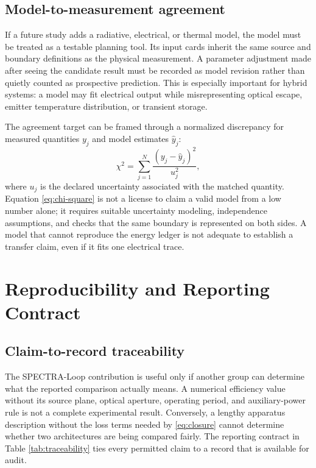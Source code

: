 \documentclass[conference]{../../../../Conference-LaTeX-template_10-17-19/IEEEtran}
\begin{document}
\subsection{Model-to-measurement agreement}
If a future study adds a radiative, electrical, or thermal model, the model must be treated as a testable planning tool. Its input cards inherit the same source and boundary definitions as the physical measurement. A parameter adjustment made after seeing the candidate result must be recorded as model revision rather than quietly counted as prospective prediction. This is especially important for hybrid systems: a model may fit electrical output while misrepresenting optical escape, emitter temperature distribution, or transient storage.

The agreement target can be framed through a normalized discrepancy for measured quantities $y_j$ and model estimates $\hat{y}_j$:
\begin{equation}
\chi^2=\sum_{j=1}^{N}\frac{\left(y_j-\hat{y}_j\right)^2}{u_j^2},
\label{eq:chi-square}
\end{equation}
where $u_j$ is the declared uncertainty associated with the matched quantity. Equation \eqref{eq:chi-square} is not a license to claim a valid model from a low number alone; it requires suitable uncertainty modeling, independence assumptions, and checks that the same boundary is represented on both sides. A model that cannot reproduce the energy ledger is not adequate to establish a transfer claim, even if it fits one electrical trace.

\section{Reproducibility and Reporting Contract}
\subsection{Claim-to-record traceability}
The SPECTRA-Loop contribution is useful only if another group can determine what the reported comparison actually means. A numerical efficiency value without its source plane, optical aperture, operating period, and auxiliary-power rule is not a complete experimental result. Conversely, a lengthy apparatus description without the loss terms needed by \eqref{eq:closure} cannot determine whether two architectures are being compared fairly. The reporting contract in Table \ref{tab:traceability} ties every permitted claim to a record that is available for audit.
\end{document}
